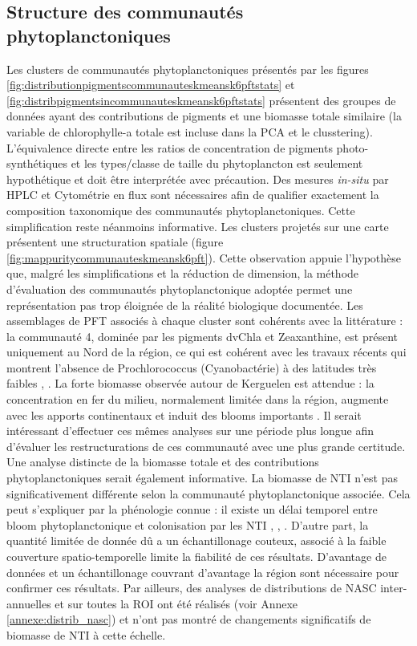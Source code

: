 \subsection{Structure des communautés phytoplanctoniques}
Les clusters de communautés phytoplanctoniques présentés par les figures \ref{fig:distributionpigmentscommunauteskmeansk6pftstats} et  \ref{fig:distribpigmentsincommunauteskmeansk6pftstats} présentent des groupes de données ayant des contributions de pigments et une biomasse totale similaire (la variable de chlorophylle-a totale est incluse dans la PCA et le clusstering). L'équivalence directe entre les ratios de concentration de pigments photo-synthétiques et les types/classe de taille du phytoplancton est seulement hypothétique et doit être interprétée avec précaution. Des mesures \textit{in-situ} par HPLC et Cytométrie en flux sont nécessaires afin de qualifier exactement la composition taxonomique des communautés phytoplanctoniques. Cette simplification reste néanmoins informative. Les clusters projetés sur une carte présentent une structuration spatiale (figure \ref{fig:mappuritycommunauteskmeansk6pft}). Cette observation appuie l'hypothèse que, malgré les simplifications et la réduction de dimension, la méthode d'évaluation des communautés phytoplanctonique adoptée permet une représentation pas trop éloignée de la réalité biologique documentée. Les assemblages de PFT associés à chaque cluster sont cohérents avec la littérature : la communauté 4, dominée par les pigments dvChla et Zeaxanthine, est présent uniquement au Nord de la région, ce qui est cohérent avec les travaux récents qui montrent l'absence de Prochlorococcus (Cyanobactérie) à des latitudes très faibles \cite{Pan2020}, \cite{Johnson2006}. La forte biomasse observée autour de Kerguelen est attendue : la concentration en fer du milieu, normalement limitée dans la région, augmente avec les apports continentaux et induit des blooms importants \cite{Blain2007}.
Il serait intéressant d'effectuer ces mêmes analyses sur une période plus longue afin d'évaluer les restructurations de ces communauté avec une plus grande certitude. Une analyse distincte de la biomasse totale et des contributions phytoplanctoniques serait également informative.
La biomasse de NTI n'est pas significativement différente selon la communauté phytoplanctonique associée. Cela peut s'expliquer par la phénologie connue : il existe un délai temporel entre bloom phytoplanctonique et colonisation par les NTI \cite{nicholson2025satellite}, \cite{kauko2021phenology}, \cite{lampe2026differences}. D'autre part, la quantité limitée de donnée dû a un échantillonage couteux, associé à la faible couverture spatio-temporelle limite la fiabilité de ces résultats. D'avantage de données et un échantillonage couvrant d'avantage la région sont nécessaire pour confirmer ces résultats. Par ailleurs, des analyses de distributions de NASC inter-annuelles et sur toutes la ROI ont été réalisés (voir Annexe \ref{annexe:distrib_nasc}) et n'ont pas montré de changements significatifs de biomasse de NTI à cette échelle.


